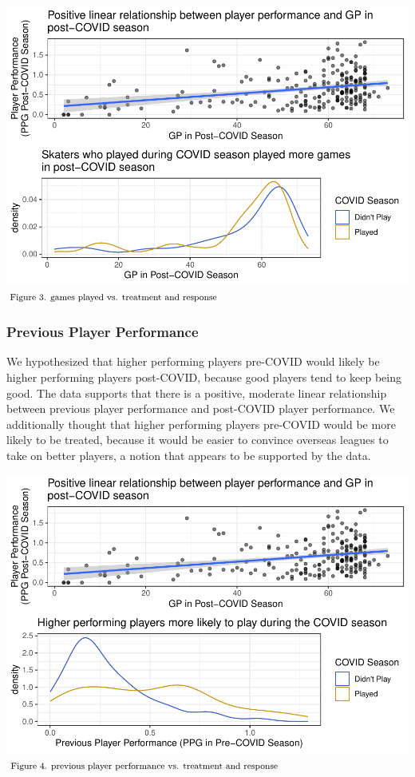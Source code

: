 \documentclass[12pt]{article}
\begin{document}
\includegraphics{journal-article_files/figure-latex/gp-plots-1.pdf}
\(\hspace*{\fill} \footnotesize \text{Figure 3. games played vs. treatment and response}\)

\hypertarget{previous-player-performance}{%
\subsubsection{Previous Player
Performance}\label{previous-player-performance}}

We hypothesized that higher performing players pre-COVID would likely be
higher performing players post-COVID, because good players tend to keep
being good. The data supports that there is a positive, moderate linear
relationship between previous player performance and post-COVID player
performance. We additionally thought that higher performing players
pre-COVID would be more likely to be treated, because it would be easier
to convince overseas leagues to take on better players, a notion that
appears to be supported by the data.

\includegraphics{journal-article_files/figure-latex/ppp-plots-1.pdf}
\(\hspace*{\fill} \footnotesize \text{Figure 4. previous player performance vs. treatment and response}\)
\end{document}
